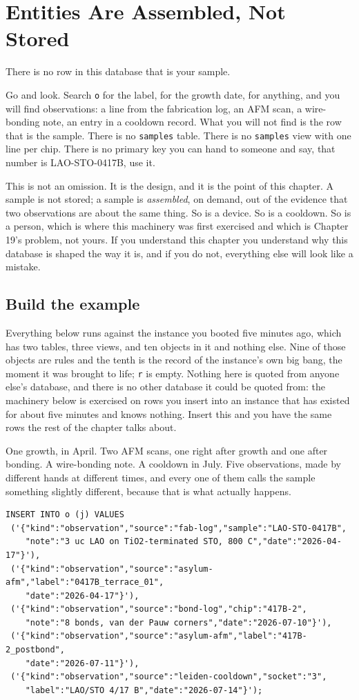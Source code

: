 \chapter{Entities Are Assembled, Not Stored}

There is no row in this database that is your sample.

Go and look. Search \texttt{o} for the label, for the growth date, for anything, and you will find observations: a line from the fabrication log, an AFM scan, a wire-bonding note, an entry in a cooldown record. What you will not find is the row that is the sample. There is no \texttt{samples} table. There is no \texttt{samples} view with one line per chip. There is no primary key you can hand to someone and say, that number is LAO-STO-0417B, use it.

This is not an omission. It is the design, and it is the point of this chapter. A sample is not stored; a sample is \emph{assembled}, on demand, out of the evidence that two observations are about the same thing. So is a device. So is a cooldown. So is a person, which is where this machinery was first exercised and which is Chapter 19's problem, not yours. If you understand this chapter you understand why this database is shaped the way it is, and if you do not, everything else will look like a mistake.

\section{Build the example}

Everything below runs against the instance you booted five minutes ago, which has two tables, three views, and ten objects in it and nothing else. Nine of those objects are rules and the tenth is the record of the instance's own big bang, the moment it was brought to life; \texttt{r} is empty. Nothing here is quoted from anyone else's database, and there is no other database it could be quoted from: the machinery below is exercised on rows you insert into an instance that has existed for about five minutes and knows nothing. Insert this and you have the same rows the rest of the chapter talks about.

One growth, in April. Two AFM scans, one right after growth and one after bonding. A wire-bonding note. A cooldown in July. Five observations, made by different hands at different times, and every one of them calls the sample something slightly different, because that is what actually happens.

\begin{lstlisting}
INSERT INTO o (j) VALUES
 ('{"kind":"observation","source":"fab-log","sample":"LAO-STO-0417B",
    "note":"3 uc LAO on TiO2-terminated STO, 800 C","date":"2026-04-17"}'),
 ('{"kind":"observation","source":"asylum-afm","label":"0417B_terrace_01",
    "date":"2026-04-17"}'),
 ('{"kind":"observation","source":"bond-log","chip":"417B-2",
    "note":"8 bonds, van der Pauw corners","date":"2026-07-10"}'),
 ('{"kind":"observation","source":"asylum-afm","label":"417B-2_postbond",
    "date":"2026-07-11"}'),
 ('{"kind":"observation","source":"leiden-cooldown","socket":"3",
    "label":"LAO/STO 4/17 B","date":"2026-07-14"}');
\end{lstlisting}

